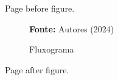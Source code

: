 \documentclass[brazil,msc]{ppgpi-abntex2}
\begin{document}
Page before figure.
\begin{landscape}
\begin{figure}[H]
  \centering
  \caption{Fluxograma}
  \par\small\textbf{Fonte:} Autores (2024)
\end{figure}
\end{landscape}
Page after figure.
\end{document}
